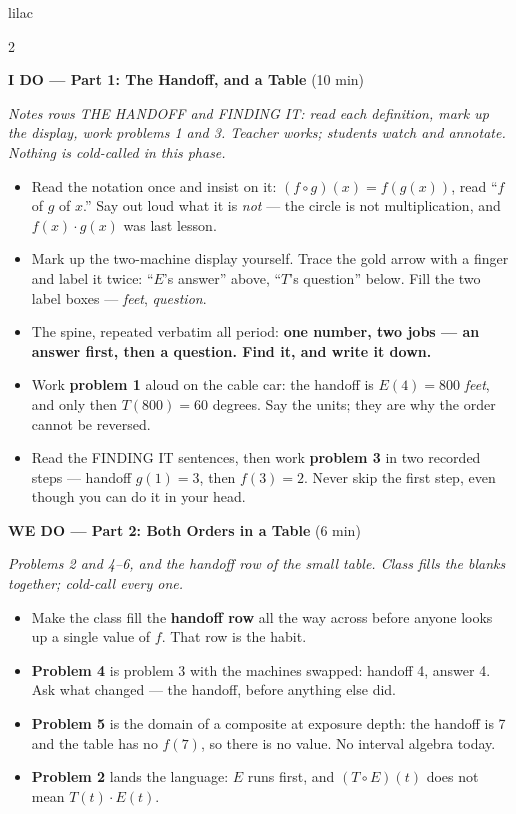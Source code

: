 \documentclass[10pt]{article}
\begin{document}
\begin{skillbox}{lilac}
\begin{multicols}{2}

\textbf{I DO --- Part 1: The Handoff, and a Table} (10 min)

\textit{Notes rows THE HANDOFF and FINDING IT: read each definition, mark up the
display, work problems 1 and 3. Teacher works; students watch and annotate.
Nothing is cold-called in this phase.}
\begin{itemize}
  \item Read the notation once and insist on it: $(f \circ g)(x) = f(g(x))$, read
        ``$f$ of $g$ of $x$.'' Say out loud what it is \emph{not} --- the circle
        is not multiplication, and $f(x)\cdot g(x)$ was last lesson.
  \item Mark up the two-machine display yourself. Trace the gold arrow with a
        finger and label it twice: ``$E$'s answer'' above, ``$T$'s question''
        below. Fill the two label boxes --- \textit{feet}, \textit{question}.
  \item The spine, repeated verbatim all period: \textbf{one number, two jobs ---
        an answer first, then a question. Find it, and write it down.}
  \item Work \textbf{problem 1} aloud on the cable car: the handoff is
        $E(4) = 800$ \emph{feet}, and only then $T(800) = 60$ degrees. Say the
        units; they are why the order cannot be reversed.
  \item Read the FINDING IT sentences, then work \textbf{problem 3} in two
        recorded steps --- handoff $g(1) = 3$, then $f(3) = 2$. Never skip the
        first step, even though you can do it in your head.
\end{itemize}

\textbf{WE DO --- Part 2: Both Orders in a Table} (6 min)

\textit{Problems 2 and 4--6, and the handoff row of the small table. Class fills
the blanks together; cold-call every one.}
\begin{itemize}
  \item Make the class fill the \textbf{handoff row} all the way across before
        anyone looks up a single value of $f$. That row is the habit.
  \item \textbf{Problem 4} is problem 3 with the machines swapped: handoff 4,
        answer 4. Ask what changed --- the handoff, before anything else did.
  \item \textbf{Problem 5} is the domain of a composite at exposure depth: the
        handoff is 7 and the table has no $f(7)$, so there is no value. No
        interval algebra today.
  \item \textbf{Problem 2} lands the language: $E$ runs first, and
        $(T \circ E)(t)$ does not mean $T(t)\cdot E(t)$.
\end{itemize}


\end{multicols}
\end{skillbox}
\end{document}
